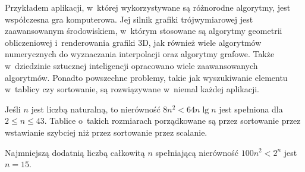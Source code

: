
\exercise %
Przykładem aplikacji, w~której wykorzystywane są różnorodne algorytmy, jest współczesna gra komputerowa.
Jej silnik grafiki trójwymiarowej jest zaawansowanym środowiskiem, w~którym stosowane są algorytmy geometrii obliczeniowej i~renderowania grafiki 3D, jak również wiele algorytmów numerycznych do wyznaczania interpolacji oraz algorytmy grafowe.
Także w~dziedzinie sztucznej inteligencji opracowano wiele zaawansowanych algorytmów.
Ponadto powszechne problemy, takie jak wyszukiwanie elementu w~tablicy czy sortowanie, są rozwiązywane w~niemal każdej aplikacji.

\exercise %
Jeśli $n$ jest liczbą naturalną, to nierówność $8n^2<64n\lg n$ jest spełniona dla $2\le n\le43$.
Tablice o~takich rozmiarach porządkowane są przez sortowanie przez wstawianie szybciej niż przez sortowanie przez scalanie.

\exercise %
Najmniejszą dodatnią liczbą całkowitą $n$ spełniającą nierówność $100n^2<2^n$ jest $n=15$.
